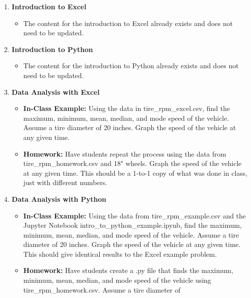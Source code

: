 \begin{enumerate}
    \item \textbf{Introduction to Excel}
        \begin{itemize}
            \item The content for the introduction to Excel
            already exists and does not need to be updated.
        \end{itemize}
    \item \textbf{Introduction to Python}
        \begin{itemize}
            \item The content for the introduction to Python
            already exists and does not need to be updated.
        \end{itemize}
    \item \textbf{Data Analysis with Excel}
        \begin{itemize}
            \item \textbf{In-Class Example:} Using the data in 
            tire\_rpm\_excel.csv, find the maximum, minimum, 
            mean, median, and mode speed of the vehicle. Assume 
            a tire diameter of 20 inches. Graph the speed of 
            the vehicle at any given time.
            \item \textbf{Homework:} Have students repeat the 
            process using the data from tire\_rpm\_homework.csv 
            and 18" wheels. Graph the speed of the vehicle at 
            any given time. This should be a 1-to-1 copy of what 
            was done in class, just with different numbers.
        \end{itemize}
    \item \textbf{Data Analysis with Python}
        \begin{itemize}
            \item \textbf{In-Class Example:} Using the data from 
            tire\_rpm\_example.csv and the Jupyter Notebook 
            intro\_to\_python\_example.ipynb, find the maximum, 
            minimum, mean, median, and mode speed of the vehicle. 
            Assume a tire diameter of 20 inches. Graph the speed 
            of the vehicle at any given time. This should give 
            identical results to the Excel example problem.
            \item \textbf{Homework:} Have students create a .py 
            file that finds the maximum, minimum, mean, median, 
            and mode speed of the vehicle using 
            tire\_rpm\_homework.csv. Assume a tire diameter of 

\end{itemize}
\end{enumerate}
